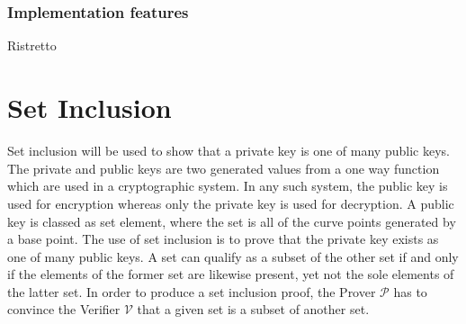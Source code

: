 \documentclass{article}
\begin{document}
\noindent{}\\\\


\subsubsection{Implementation features}
\item Ristretto 
\ 

\section{Set Inclusion}
Set inclusion will be used to show that a private key is one of many public keys. The private and public keys are two generated values from a one way function which are used in a cryptographic system. In any such system, the public key is used for encryption whereas only the private key is used for decryption. A public key is classed as set element, where the set is all of the curve points generated by a base point. The use of set inclusion is to prove that the private key exists as one of many public keys. A set can qualify as a subset of the other set if and only if the elements of the former set are likewise present, yet not the sole elements of the latter set. In order to produce a set inclusion proof, the Prover $\mathcal{P}$ has to convince the Verifier $\mathcal{V}$ that a given set is a subset of another set.
\end{document}
